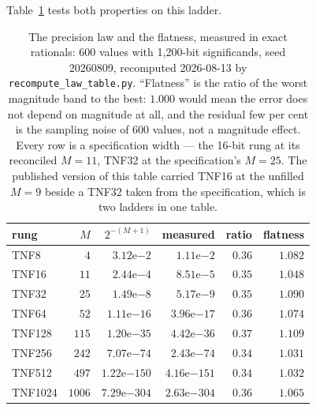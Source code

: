 \documentclass[11pt]{article}
\theoremstyle{definition}
\begin{document}
Table~\ref{tab:law} tests both properties on this ladder.

\begin{table}[t]\centering
\caption{The precision law and the flatness, measured in exact rationals: 600
values with 1{,}200-bit significands, seed 20260809, recomputed 2026-08-13 by
\texttt{recompute\_law\_table.py}. ``Flatness'' is the ratio of the worst
magnitude band to the best: $1.000$ would mean the error does not depend on
magnitude at all, and the residual few per cent is the sampling noise of 600
values, not a magnitude effect. Every row is a specification width --- the 16-bit
rung at its reconciled $M{=}11$, TNF32 at the specification's $M{=}25$. The
published version of this table carried TNF16 at the unfilled $M{=}9$ beside a
TNF32 taken from the specification, which is two ladders in one table.}
\label{tab:law}
\begin{tabular}{lrrrrr}
\toprule
rung & $M$ & $2^{-(M+1)}$ & measured & ratio & flatness \\
\midrule
TNF8    & $4$    & $3.12\mathrm{e}{-2}$   & $1.11\mathrm{e}{-2}$   & $0.36$ & $1.082$ \\
TNF16   & $11$   & $2.44\mathrm{e}{-4}$   & $8.51\mathrm{e}{-5}$   & $0.35$ & $1.048$ \\
TNF32   & $25$   & $1.49\mathrm{e}{-8}$   & $5.17\mathrm{e}{-9}$   & $0.35$ & $1.090$ \\
TNF64   & $52$   & $1.11\mathrm{e}{-16}$  & $3.96\mathrm{e}{-17}$  & $0.36$ & $1.074$ \\
TNF128  & $115$  & $1.20\mathrm{e}{-35}$  & $4.42\mathrm{e}{-36}$  & $0.37$ & $1.109$ \\
TNF256  & $242$  & $7.07\mathrm{e}{-74}$  & $2.43\mathrm{e}{-74}$  & $0.34$ & $1.031$ \\
TNF512  & $497$  & $1.22\mathrm{e}{-150}$ & $4.16\mathrm{e}{-151}$ & $0.34$ & $1.032$ \\
TNF1024 & $1006$ & $7.29\mathrm{e}{-304}$ & $2.63\mathrm{e}{-304}$ & $0.36$ & $1.065$ \\
\bottomrule
\end{tabular}
\end{table}
\end{document}
